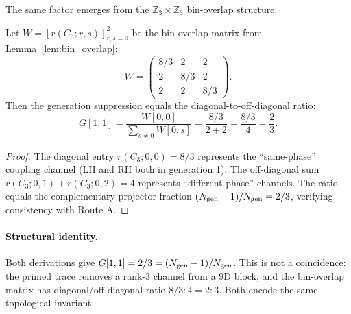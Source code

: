 The same factor emerges from the $\mathbb{Z}_3 \times \mathbb{Z}_3$ bin-overlap structure:

\begin{corollary}\label{cor:G-bin-overlap}
Let $W = [r(C_3; r, s)]_{r,s=0}^2$ be the bin-overlap matrix from Lemma~\ref{lem:bin_overlap}:
\begin{equation}
W = \begin{pmatrix} 8/3 & 2 & 2 \\ 2 & 8/3 & 2 \\ 2 & 2 & 8/3 \end{pmatrix}.
\end{equation}
Then the generation suppression equals the diagonal-to-off-diagonal ratio:
\begin{equation}
G[1,1] = \frac{W[0,0]}{\sum_{s \neq 0} W[0,s]} = \frac{8/3}{2 + 2} = \frac{8/3}{4} = \frac{2}{3}.
\end{equation}
\end{corollary}

\begin{proof}
The diagonal entry $r(C_3; 0, 0) = 8/3$ represents the ``same-phase'' coupling channel 
(LH and RH both in generation 1). The off-diagonal sum $r(C_3; 0, 1) + r(C_3; 0, 2) = 4$ 
represents ``different-phase'' channels. The ratio equals the complementary projector 
fraction $(N_{\rm gen} - 1)/N_{\rm gen} = 2/3$, verifying consistency with Route A.
\end{proof}

\paragraph{Structural identity.}
Both derivations give $G[1,1] = 2/3 = (N_{\rm gen} - 1)/N_{\rm gen}$. This is not a coincidence: 
the primed trace removes a rank-3 channel from a 9D block, and the bin-overlap matrix 
has diagonal/off-diagonal ratio $8/3 : 4 = 2 : 3$. Both encode the same topological invariant.

